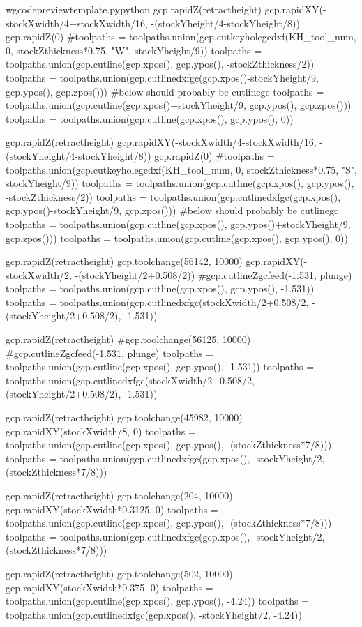 \documentclass{ltxdoc}
\begin{document}
\begin{writecode}{w}{gcodepreviewtemplate.py}{python}
gcp.rapidZ(retractheight)
gcp.rapidXY(-stockXwidth/4+stockXwidth/16, -(stockYheight/4-stockYheight/8))
gcp.rapidZ(0)
#toolpaths = toolpaths.union(gcp.cutkeyholegcdxf(KH_tool_num, 0, stockZthickness*0.75, "W", stockYheight/9))
toolpaths = toolpaths.union(gcp.cutline(gcp.xpos(), gcp.ypos(), -stockZthickness/2))
toolpaths = toolpaths.union(gcp.cutlinedxfgc(gcp.xpos()-stockYheight/9, gcp.ypos(), gcp.zpos()))
#below should probably be cutlinegc
toolpaths = toolpaths.union(gcp.cutline(gcp.xpos()+stockYheight/9, gcp.ypos(), gcp.zpos()))
toolpaths = toolpaths.union(gcp.cutline(gcp.xpos(), gcp.ypos(), 0))

gcp.rapidZ(retractheight)
gcp.rapidXY(-stockXwidth/4-stockXwidth/16, -(stockYheight/4-stockYheight/8))
gcp.rapidZ(0)
#toolpaths = toolpaths.union(gcp.cutkeyholegcdxf(KH_tool_num, 0, stockZthickness*0.75, "S", stockYheight/9))
toolpaths = toolpaths.union(gcp.cutline(gcp.xpos(), gcp.ypos(), -stockZthickness/2))
toolpaths = toolpaths.union(gcp.cutlinedxfgc(gcp.xpos(), gcp.ypos()-stockYheight/9, gcp.zpos()))
#below should probably be cutlinegc
toolpaths = toolpaths.union(gcp.cutline(gcp.xpos(), gcp.ypos()+stockYheight/9, gcp.zpos()))
toolpaths = toolpaths.union(gcp.cutline(gcp.xpos(), gcp.ypos(), 0))

gcp.rapidZ(retractheight)
gcp.toolchange(56142, 10000)
gcp.rapidXY(-stockXwidth/2, -(stockYheight/2+0.508/2))
#gcp.cutlineZgcfeed(-1.531, plunge)
toolpaths = toolpaths.union(gcp.cutline(gcp.xpos(), gcp.ypos(), -1.531))
toolpaths = toolpaths.union(gcp.cutlinedxfgc(stockXwidth/2+0.508/2, -(stockYheight/2+0.508/2), -1.531))

gcp.rapidZ(retractheight)
#gcp.toolchange(56125, 10000)
#gcp.cutlineZgcfeed(-1.531, plunge)
toolpaths = toolpaths.union(gcp.cutline(gcp.xpos(), gcp.ypos(), -1.531))
toolpaths = toolpaths.union(gcp.cutlinedxfgc(stockXwidth/2+0.508/2, (stockYheight/2+0.508/2), -1.531))

gcp.rapidZ(retractheight)
gcp.toolchange(45982, 10000)
gcp.rapidXY(stockXwidth/8, 0)
toolpaths = toolpaths.union(gcp.cutline(gcp.xpos(), gcp.ypos(), -(stockZthickness*7/8)))
toolpaths = toolpaths.union(gcp.cutlinedxfgc(gcp.xpos(), -stockYheight/2, -(stockZthickness*7/8)))

gcp.rapidZ(retractheight)
gcp.toolchange(204, 10000)
gcp.rapidXY(stockXwidth*0.3125, 0)
toolpaths = toolpaths.union(gcp.cutline(gcp.xpos(), gcp.ypos(), -(stockZthickness*7/8)))
toolpaths = toolpaths.union(gcp.cutlinedxfgc(gcp.xpos(), -stockYheight/2, -(stockZthickness*7/8)))

gcp.rapidZ(retractheight)
gcp.toolchange(502, 10000)
gcp.rapidXY(stockXwidth*0.375, 0)
toolpaths = toolpaths.union(gcp.cutline(gcp.xpos(), gcp.ypos(), -4.24))
toolpaths = toolpaths.union(gcp.cutlinedxfgc(gcp.xpos(), -stockYheight/2, -4.24))


\end{writecode}
\end{document}
